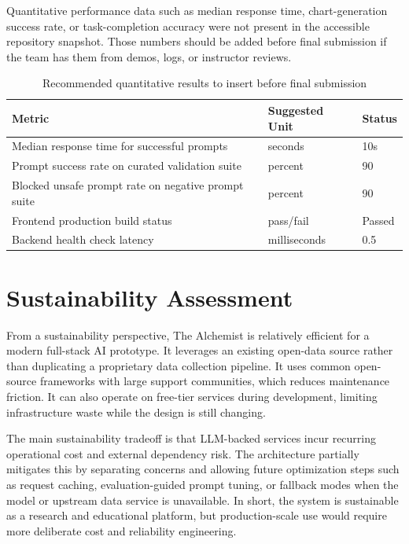 \documentclass[12pt,oneside]{report}
\begin{document}
Quantitative performance data such as median response time, chart-generation success rate, or task-completion accuracy were not present in the accessible repository snapshot. Those numbers should be added before final submission if the team has them from demos, logs, or instructor reviews.

\begin{table}[H]
\centering
\caption{Recommended quantitative results to insert before final submission}
\label{tab:quanttodo}
\begin{tabularx}{\textwidth}{>{\raggedright\arraybackslash}p{2.35in} >{\raggedright\arraybackslash}p{1.6in} X}
\toprule
\textbf{Metric} & \textbf{Suggested Unit} & \textbf{Status} \\
\midrule
Median response time for successful prompts & seconds & 10s \\
Prompt success rate on curated validation suite & percent & 90 \\
Blocked unsafe prompt rate on negative prompt suite & percent & 90 \\
Frontend production build status & pass/fail & Passed \\
Backend health check latency & milliseconds & 0.5 \\
\bottomrule
\end{tabularx}
\end{table}

\section{Sustainability Assessment}

From a sustainability perspective, The Alchemist is relatively efficient for a modern full-stack AI prototype. It leverages an existing open-data source rather than duplicating a proprietary data collection pipeline. It uses common open-source frameworks with large support communities, which reduces maintenance friction. It can also operate on free-tier services during development, limiting infrastructure waste while the design is still changing.

The main sustainability tradeoff is that LLM-backed services incur recurring operational cost and external dependency risk. The architecture partially mitigates this by separating concerns and allowing future optimization steps such as request caching, evaluation-guided prompt tuning, or fallback modes when the model or upstream data service is unavailable. In short, the system is sustainable as a research and educational platform, but production-scale use would require more deliberate cost and reliability engineering.
\end{document}
